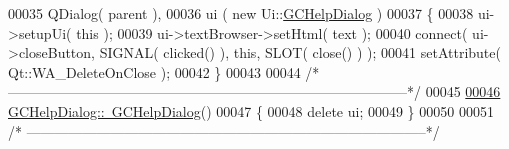 \begin{DoxyCode}
00035   QDialog( parent ),
00036   ui     ( new Ui::\hyperlink{class_g_c_help_dialog}{GCHelpDialog} )
00037 \{
00038   ui->setupUi( \textcolor{keyword}{this} );
00039   ui->textBrowser->setHtml( text );
00040   connect( ui->closeButton, SIGNAL( clicked() ), \textcolor{keyword}{this}, SLOT( close() ) );
00041   setAttribute( Qt::WA\_DeleteOnClose );
00042 \}
00043 
00044 \textcolor{comment}{/*
      --------------------------------------------------------------------------------------*/}
00045 
\hypertarget{gchelpdialog_8cpp_source_l00046}{}\hyperlink{class_g_c_help_dialog_ae8e5aa465ea3bd2fa4d922b0cc09cfdc}{00046} \hyperlink{class_g_c_help_dialog_ae8e5aa465ea3bd2fa4d922b0cc09cfdc}{GCHelpDialog::~GCHelpDialog}()
00047 \{
00048   \textcolor{keyword}{delete} ui;
00049 \}
00050 
00051 \textcolor{comment}{/*
      --------------------------------------------------------------------------------------*/}
\end{DoxyCode}
